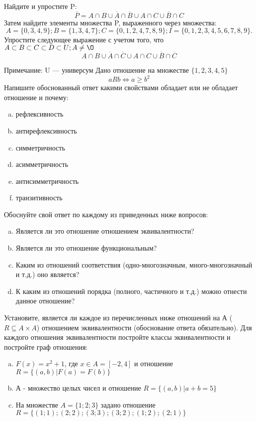 \documentclass[10pt]{exam}
\begin{document}
\begin{questions}
\question
Найдите и упростите P:
\begin{equation*}
\overline{P} = A \cap B \cup \overline{A} \cap \overline{B} \cup A \cap C \cup \overline{B} \cap C
\end{equation*}
Затем найдите элементы множества P, выраженного через множества:
\begin{equation*}
A = \{0, 3, 4, 9\}; 
B = \{1, 3, 4, 7\};
C = \{0, 1, 2, 4, 7, 8, 9\};
I = \{0, 1, 2, 3, 4, 5, 6, 7, 8, 9\}.
\end{equation*}\question
Упростите следующее выражение с учетом того, что $A\subset B \subset C \subset D \subset U; A \neq \O$
\begin{equation*}
A \cap B \cup \overline{A} \cap \overline{C} \cup A \cap C \cup \overline{B} \cap \overline{C}
\end{equation*}

Примечание: U — универсум\question
Дано отношение на множестве $\{1, 2, 3, 4, 5\}$ 
\begin{equation*}
aRb \iff a \geq b^2
\end{equation*}
Напишите обоснованный ответ какими свойствами обладает или не обладает отношение и почему:   
\begin{enumerate} [a)]\setcounter{enumi}{0}
\item рефлексивность
\item антирефлексивность
\item симметричность
\item асимметричность
\item антисимметричность
\item транзитивность
\end{enumerate}

Обоснуйте свой ответ по каждому из приведенных ниже вопросов:
\begin{enumerate} [a)]\setcounter{enumi}{0}
    \item Является ли это отношение отношением эквивалентности?
    \item Является ли это отношение функциональным?
    \item Каким из отношений соответствия (одно-многозначным, много-многозначный и т.д.) оно является?
    \item К каким из отношений порядка (полного, частичного и т.д.) можно отнести данное отношение?
\end{enumerate}


\question
Установите, является ли каждое из перечисленных ниже отношений на А ($R \subseteq A \times A$) отношением эквивалентности (обоснование ответа обязательно). Для каждого отношения эквивалентности постройте классы эквивалентности и постройте граф отношения:
\begin{enumerate} [a)]\setcounter{enumi}{0}
\item $F(x)=x^{2}+1$, где $x \in A = [-2, 4]$ и отношение $R = \{(a,b)|F(a) = F(b)\}$
\item А - множество целых чисел и отношение $R = \{(a,b)|a + b = 5\}$
\item На множестве $A = \{1; 2; 3\}$ задано отношение $R = \{(1; 1); (2; 2); (3; 3); (3; 2); (1; 2); (2; 1)\}$


\end{enumerate}
\end{questions}
\end{document}
